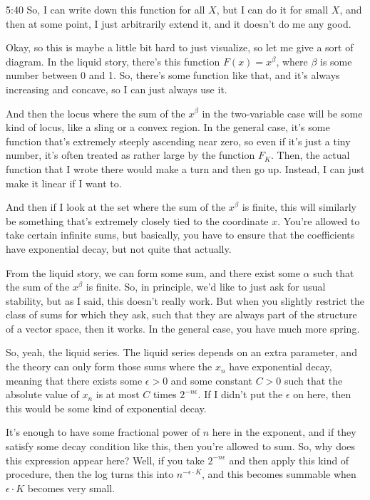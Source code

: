 \begin{unfinished}{5:40}
So, I can write down this function for all $X$, but I can do it for small $X$, and then at some point, I just arbitrarily extend it, and it doesn't do me any good.

Okay, so this is maybe a little bit hard to just visualize, so let me give a sort of diagram. In the liquid story, there's this function $F(x) = x^{\beta}$, where $\beta$ is some number between 0 and 1. So, there's some function like that, and it's always increasing and concave, so I can just always use it.

And then the locus where the sum of the $x^{\beta}$ in the two-variable case will be some kind of locus, like a sling or a convex region. In the general case, it's some function that's extremely steeply ascending near zero, so even if it's just a tiny number, it's often treated as rather large by the function $F_K$. Then, the actual function that I wrote there would make a turn and then go up. Instead, I can just make it linear if I want to.

And then if I look at the set where the sum of the $x^{\beta}$ is finite, this will similarly be something that's extremely closely tied to the coordinate $x$. You're allowed to take certain infinite sums, but basically, you have to ensure that the coefficients have exponential decay, but not quite that actually.

From the liquid story, we can form some sum, and there exist some $\alpha$ such that the sum of the $x^{\beta}$ is finite. So, in principle, we'd like to just ask for usual stability, but as I said, this doesn't really work. But when you slightly restrict the class of sums for which they ask, such that they are always part of the structure of a vector space, then it works. In the general case, you have much more spring.

So, yeah, the liquid series. The liquid series depends on an extra parameter, and the theory can only form those sums where the $x_n$ have exponential decay, meaning that there exists some $\epsilon > 0$ and some constant $C > 0$ such that the absolute value of $x_n$ is at most $C$ times $2^{-n\epsilon}$. If I didn't put the $\epsilon$ on here, then this would be some kind of exponential decay.

It's enough to have some fractional power of $n$ here in the exponent, and if they satisfy some decay condition like this, then you're allowed to sum. So, why does this expression appear here? Well, if you take $2^{-n\epsilon}$ and then apply this kind of procedure, then the log turns this into $n^{-\epsilon\cdot K}$, and this becomes summable when $\epsilon\cdot K$ becomes very small.


\end{unfinished}
